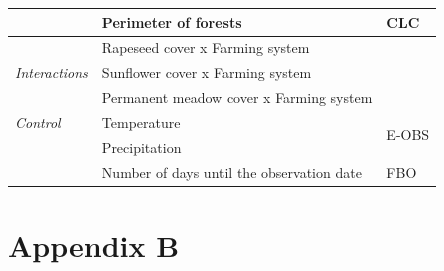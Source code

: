 \documentclass[smallextended]{svjour3}       %
\begin{document}
\begin{table}[H]
\begin{center}
\begin{tabular}{lll}
                                       & Perimeter of forests                               & CLC                                      \\ \hline
\multirow{3}{*}{\textit{Interactions}} & Rapeseed cover x Farming system                    &                                          \\
                                       & Sunflower cover x Farming system                   &                                          \\
                                       & Permanent meadow cover x Farming system            &                                          \\ \hline
\textit{Control}                       & Temperature                                        & \multirow{2}{*}{E-OBS}                   \\
                                       & Precipitation                                      &                                          \\
                                       & Number of days until the observation date          & FBO                                     
\end{tabular}
\label{tab:appendixA}
\end{center}
\end{table}

\clearpage

\hypertarget{appendix-b}{%
\section{Appendix B}\label{appendix-b}}
\end{document}
